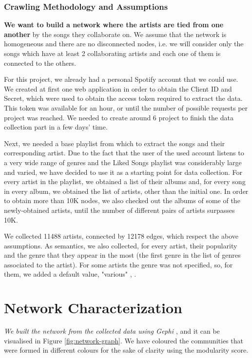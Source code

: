 \documentclass[sigchi]{acmart}
\begin{document}
\subsubsection{Crawling Methodology and Assumptions}
{\bf We want to build a network where the artists are tied from one another} by the songs they collaborate on. We assume that the network is homogeneous and there are no disconnected nodes, i.e. we will consider only the songs which have at least 2 collaborating artists and each one of them is connected to the others. 

For this project, we already had a personal Spotify account that we could use. We created at first one web application in order to obtain the Client ID and Secret, which were used to obtain the access token required to extract the data. This token was available for an hour, or until the number of possible requests per project was reached. We needed to create around 6 project to finish the data collection part in a few days' time.\cite{accesstoken}

Next, we needed a base playlist from which to extract the songs and their corresponding artist. Due to the fact that the user of the used account listens to a very wide range of genres and the Liked Songs playlist was considerably large and varied, we have decided to use it as a starting point for data collection. For every artist in the playlist, we obtained a list of their albums and, for every song in every album, we obtained the list of artists, other than the initial one. In order to obtain more than 10K nodes, we also checked out the albums of some of the newly-obtained artists, until the number of different pairs of artists surpasses 10K.

We collected 11488 artists, connected by 12178 edges, which respect the above assumptions. As semantics, we also collected, for every artist, their popularity and the genre that they appear in the most (the first genre in the list of genres associated to the artist). For some artists the genre was not specified, so, for them, we added a default value, "various" \cite{pandas}, \cite{NumPyDoc}.

\section{Network Characterization \cite{SNALectures}}

{\em We built the network from the collected data using Gephi \cite{gephidoc}}, and it can be visualised in Figure \ref{fig:network-graph}. We have coloured the communities that were formed in different colours for the sake of clarity using the modularity score.
\end{document}
